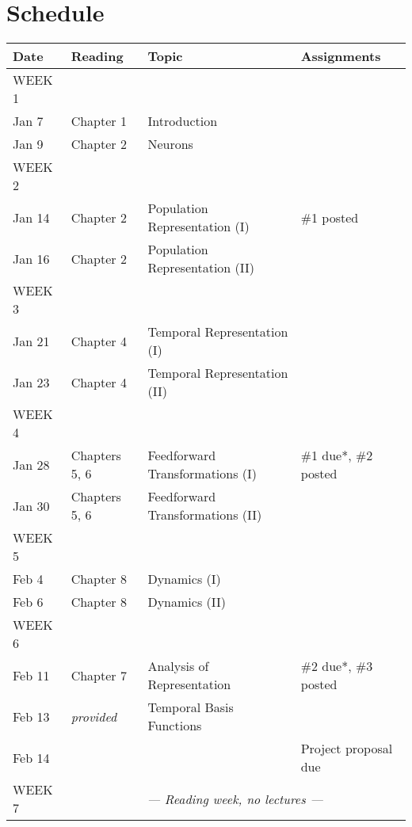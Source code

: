 \documentclass[10pt,letterpaper,oneside]{article}
\begin{document}
\section{Schedule}

\begin{center}
\small
\begin{tabular}{p{2.5cm} p{2.5cm} p{6cm} p{3.75cm}}
	\toprule
	\textbf{Date} &	\textbf{Reading} &	\textbf{Topic} & \textbf{Assignments} \\
	\midrule
	\footnotesize WEEK 1 & & & \\
	Jan 7 &
	Chapter 1 &
	Introduction &
	\\
	Jan 9 &
	Chapter 2 &
	Neurons &
	\\[0.125cm]
	
	\footnotesize WEEK 2 & & & \\
	Jan 14 &
	Chapter 2 &
	Population Representation (I) &
	\#1 posted\\
	Jan 16 &
	Chapter 2 &
	Population Representation (II) &
	\\[0.125cm]

	\footnotesize WEEK 3 & & & \\
	Jan 21 &
	Chapter 4 &
	Temporal Representation (I) &
	\\
	Jan 23 &
	Chapter 4 &
	Temporal Representation (II) &
	\\[0.125cm]

	\footnotesize WEEK 4 & & & \\
	Jan 28 &
	Chapters 5, 6 &
	Feedforward Transformations (I) &
	\#1 due*, \#2 posted\\
	Jan 30 &
	Chapters 5, 6 &
	Feedforward Transformations (II) &
	\\[0.125cm]

	\footnotesize WEEK 5 & & & \\
	Feb 4 &
	Chapter 8 &
	Dynamics (I) &
	\\
	Feb 6 &
	Chapter 8 &
	Dynamics (II) &
	\\[0.125cm]

	\footnotesize WEEK 6 & & & \\
	Feb 11 &
	Chapter 7 &
	Analysis of Representation &
	\#2 due*, \#3 posted\\
	Feb 13 &
	\emph{provided} &
	Temporal Basis Functions &
	\\
	Feb 14 &
	&
	&
	Project proposal due\\[0.125cm]

	\footnotesize WEEK 7 & \multicolumn{3}{c}{\emph{--- Reading week, no lectures ---}} \\[0.125cm]


\end{tabular}
\end{center}
\end{document}
